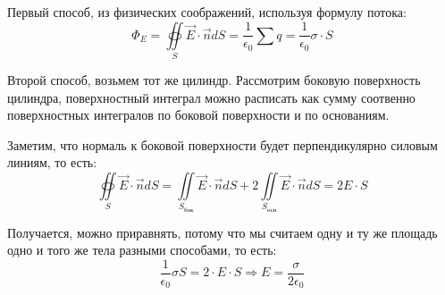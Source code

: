 \documentclass[../main.tex]{subfiles}
\begin{document}
Первый способ, из физических соображений, используя формулу потока:
\[ \Phi_E = \oiint\limits_S \vec E \cdot \vec n dS = \frac{1}{\epsilon_0} \sum_{}^{} q
    = \frac{1}{\epsilon_0} \sigma \cdot S \]

Второй способ, возьмем тот же цилиндр. Рассмотрим боковую поверхность цилиндра, поверхностный интеграл можно расписать как сумму соотвенно поверхностных интегралов по боковой поверхности и по основаниям.

\vspace{5px}

Заметим, что нормаль к боковой поверхности будет перпендикулярно силовым линиям, то есть:
\[ \oiint\limits_S \vec E \cdot \vec n dS = \iint\limits_{S_{\text{бок}}} \vec E \cdot \vec n dS + 2\iint\limits_{S_{\text{осн}}} \vec E \cdot \vec n dS
    = 2 E \cdot S \]

Получается, можно приравнять, потому что мы считаем одну и ту же площадь одно и того же тела разными способами, то есть:
\[\frac{1}{\epsilon_0} \sigma S = 2 \cdot E \cdot S \Rightarrow E = \frac{\sigma}{2 \epsilon_0}\]
\end{document}
